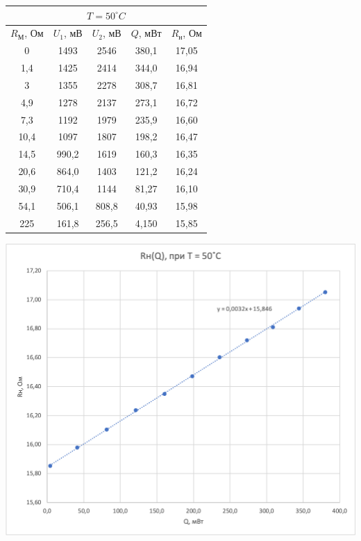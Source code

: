 \documentclass[a4paper, 12pt]{article}
\begin{document}
    \begin{table}
        
        \begin{minipage}[ht]{0.47\linewidth}
            \begin{tabular}{|c|c|c|c|c|}
                \hline
                \multicolumn{5}{|c|}{$T = 50^\circ C$} \\
                \hline
                $R_М$, Ом & $U_1$, мВ & $U_2$, мВ & $Q$, мВт & $R_н$, Ом \\
                \hline
                0 & 1493 & 2546 & 380,1 & 17,05 \\
                \hline
                1,4 & 1425 & 2414 & 344,0 & 16,94 \\
                \hline
                3 & 1355 & 2278 & 308,7 & 16,81 \\
                \hline
                4,9 & 1278 & 2137 & 273,1 & 16,72 \\
                \hline
                7,3 & 1192 & 1979 & 235,9 & 16,60 \\
                \hline
                10,4 & 1097 & 1807 & 198,2 & 16,47 \\
                \hline
                14,5 & 990,2 & 1619 & 160,3 & 16,35 \\
                \hline
                20,6 & 864,0 & 1403 & 121,2 & 16,24 \\
                \hline
                30,9 & 710,4 & 1144 & 81,27 & 16,10 \\
                \hline
                54,1 & 506,1 & 808,8 & 40,93 & 15,98 \\
                \hline
                225 & 161,8 & 256,5 & 4,150 & 15,85 \\
                \hline
            \end{tabular}
        \end{minipage}
        \hfill
        \begin{minipage}[ht]{0.47\linewidth}
            \includegraphics[width=\linewidth]{images/ch4.png}
        \end{minipage}
        

\end{table}
\end{document}
